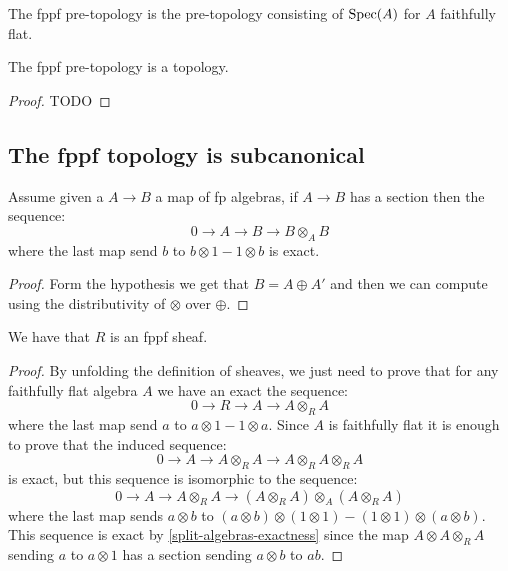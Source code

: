 \begin{definition}
The fppf pre-topology is the pre-topology consisting of $\operatorname{Spec}(A)$ for $A$ faithfully flat.
\end{definition}

\begin{lemma}
The fppf pre-topology is a topology.
\end{lemma}

\begin{proof}
TODO
\end{proof}


\subsection{The fppf topology is subcanonical}

\begin{lemma}\label{split-algebras-exactness}
Assume given a $A\to B$ a map of fp algebras, if $A\to B$ has a section then the sequence:
\[0 \to A \to B \to B\otimes_AB\]
where the last map send $b$ to $b\otimes 1 - 1 \otimes b$ is exact.
\end{lemma}

\begin{proof}
Form the hypothesis we get that $B = A\oplus A'$ and then we can compute using the distributivity of $\otimes$ over $\oplus$.
\end{proof}

\begin{proposition}
We have that $R$ is an fppf sheaf.
\end{proposition}

\begin{proof}
By unfolding the definition of sheaves, we just need to prove that for any faithfully flat algebra $A$ we have an exact the sequence:
\[0\to R\to A\to A\otimes_R A\]
where the last map send $a$ to $a\otimes 1 - 1 \otimes a$. Since $A$ is faithfully flat it is enough to prove that the induced sequence:
\[0 \to A \to A\otimes_RA\to A\otimes_RA\otimes_RA\]
is exact, but this sequence is isomorphic to the sequence:
\[0\to A\to A\otimes_RA \to (A\otimes_RA)\otimes_A(A\otimes_RA)\]
where the last map sends $a\otimes b$ to $(a\otimes b)\otimes (1\otimes 1) - (1\otimes 1)\otimes (a\otimes b)$. This sequence is exact by \cref{split-algebras-exactness} since the map $A\otimes A\otimes_RA$ sending $a$ to $a\otimes 1$ has a section sending $a\otimes b$ to $ab$. 
\end{proof}
